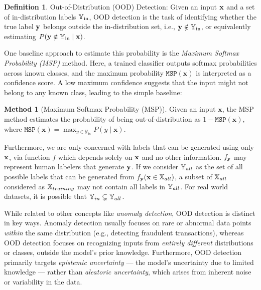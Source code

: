\documentclass[11pt, oneside]{book}
\theoremstyle{plain}
\theoremstyle{definition}
\newtheorem{definition}[theorem]{Definition}
\newtheorem{method}[theorem]{Method}
\theoremstyle{remark}
\begin{document}
\begin{definition}
    Out-of-Distribution (OOD) Detection: Given an input ${\mathbf{x}}$ and a set of in-distribution labels ${\mathbb{Y}}_{\text{in}}$, OOD detection is the task of identifying whether the true label ${\mathbf{y}}$ belongs outside the in-distribution set, i.e., ${\mathbf{y}} \notin {\mathbb{Y}}_{\text{in}}$, or equivalently estimating $P({\mathbf{y}} \notin {\mathbb{Y}}_{\text{in}} \mid {\mathbf{x}})$.
    \label{defineood}
    \vspace{-2mm}
\end{definition}

One baseline approach to estimate this probability is the \textit{Maximum Softmax Probability (MSP)} method. Here, a trained classifier outputs softmax probabilities across known classes, and the maximum probability $\texttt{MSP}(\mathbf{x})$ is interpreted as a confidence score. A low maximum confidence suggests that the input might not belong to any known class, leading to the simple baseline:

\begin{method}[Maximum Softmax Probability (MSP)]
Given an input $\mathbf{x}$, the MSP method estimates the probability of being out-of-distribution as $1 - \texttt{MSP}(\mathbf{x})$, where $\texttt{MSP}(\mathbf{x}) = \max_{y \in \mathcal{Y}_{\text{in}}} P(y \mid \mathbf{x})$.
\label{methodmsp}
\end{method}

Furthermore, we are only concerned with labels that can be generated using only ${\mathbf{x}}$, via function $f$ which depends solely on ${\mathbf{x}}$ and no other information. $f_{\mathbf{y}}$ may represent human labelers that generate ${\mathbf{y}}$. If we consider ${\mathbb{Y}}_{all}$ as the set of all possible labels that can be generated from $f_{\mathbf{y}}({\mathbf{x}} \in {\mathbb{X}}_{all})$, a subset of ${\mathbb{X}}_{all}$ considered as ${\mathbb{X}}_{training}$ may not contain all labels in ${\mathbb{Y}}_{all}$. For real world datasets, it is possible that ${\mathbb{Y}}_{in} \subsetneq {\mathbb{Y}}_{all}$.



While related to other concepts like \textit{anomaly detection}, OOD detection is distinct in key ways. Anomaly detection usually focuses on rare or abnormal data points \textit{within} the same distribution (e.g., detecting fraudulent transactions), whereas OOD detection focuses on recognizing inputs from \textit{entirely different} distributions or classes, outside the model’s prior knowledge. Furthermore, OOD detection primarily targets \textit{epistemic uncertainty} — the model’s uncertainty due to limited knowledge — rather than \textit{aleatoric uncertainty}, which arises from inherent noise or variability in the data.
\end{document}
